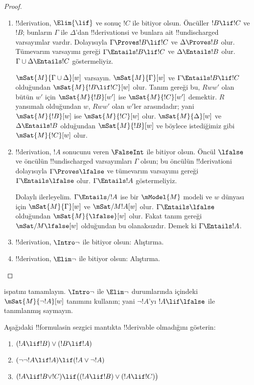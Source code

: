 \begin{proof}
\begin{enumerate}
  \item !!{derivation}, $\Elim{\lif}$ ve sonuç $!C$ ile bitiyor olsun.
    Öncüller $!B\lif !C$ ve $!B$; bunların $\Gamma$ ile $\Delta$'dan
    !!{derivation}s{}i ve bunlara ait !!{undischarged} varsayımlar vardır.
    Dolayısıyla
    $\Gamma\Proves !B\lif !C$ ve $\Delta\Proves !B$ olur. Tümevarım
    varsayımı gereği $\Gamma\Entails !B\lif !C$ ve
    $\Delta\Entails !B$ olur. $\Gamma\cup\Delta\Entails !C$
    göstermeliyiz.

    $\mSat{M}{\Gamma\cup\Delta}[w]$ varsayın.
    $\mSat{M}{\Gamma}[w]$ ve $\Gamma\Entails !B\lif !C$ olduğundan
    $\mSat{M}{!B\lif !C}[w]$ olur. Tanım gereği bu, $Rww'$ olan bütün
    $w'$ için $\mSat{M}{!B}[w']$ ise $\mSat{M}{!C}[w']$ demektir.
    $R$ yansımalı olduğundan $w$, $Rww'$ olan $w'$ler arasındadır; yani
    $\mSat{M}{!B}[w]$ ise $\mSat{M}{!C}[w]$ olur.
    $\mSat{M}{\Delta}[w]$ ve $\Delta\Entails !B$ olduğundan
    $\mSat{M}{!B}[w]$ ve böylece istediğimiz gibi $\mSat{M}{!C}[w]$ olur.

  \item !!{derivation}, $!A$ sonucunu veren $\FalseInt$ ile bitiyor olsun.
    Öncül $\lfalse$ ve öncülün !!{undischarged} varsayımları $\Gamma$ olsun;
    bu öncülün !!{derivation}{}i dolayısıyla $\Gamma\Proves\lfalse$ ve
    tümevarım varsayımı
    gereği $\Gamma\Entails\lfalse$ olur. $\Gamma\Entails !A$
    göstermeliyiz.

    Dolaylı ilerleyelim. $\Gamma\Entails/ !A$ ise bir $\mModel{M}$ modeli
    ve $w$ dünyası için $\mSat{M}{\Gamma}[w]$ ve $\mSat/{M}{!A}[w]$ olur.
    $\Gamma\Entails\lfalse$ olduğundan $\mSat{M}{\lfalse}[w]$ olur. Fakat
    tanım gereği $\mSat/{M}{\lfalse}[w]$ olduğundan bu olanaksızdır.
    Demek ki $\Gamma\Entails !A$.
  \item !!{derivation}, $\Intro\lnot$ ile bitiyor olsun: Alıştırma.
  \item !!{derivation}, $\Elim\lnot$ ile bitiyor olsun: Alıştırma.
  \end{enumerate}
\end{proof}

\begin{prob}
   ispatını tamamlayın.
  $\Intro\lnot$ ile $\Elim\lnot$ durumlarında
   içindeki
  $\mSat{M}{\lnot !A}[w]$ tanımını kullanın; yani $\lnot !A$'yı
  $!A\lif\lfalse$ ile tanımlanmış saymayın.
\end{prob}

\begin{prob}
  Aşağıdaki !!{formula}s{}in sezgici mantıkta !!{derivable} olmadığını gösterin:
  \begin{enumerate}
    \item $(!A \lif !B) \lor (!B \lif !A)$
    \item $(\lnot\lnot !A \lif !A) \lif (!A \lor \lnot !A)$
    \item $(!A \lif !B \lor !C) \lif \bigl((!A \lif !B)\lor(!A \lif !C)\bigr)$
  \end{enumerate}
\end{prob}

